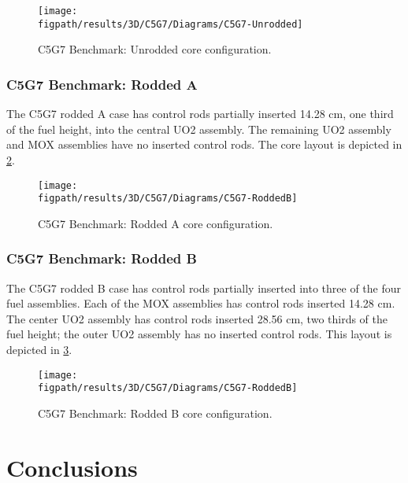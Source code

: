 {{{{        \begin{figure}[htbp]
          \centering
          \texttt{[image: \\figpath/results/3D/C5G7/Diagrams/C5G7-Unrodded]}
          \caption{C5G7 Benchmark: Unrodded core configuration. \label{fig:MR:C5G7:Unrodded}}
        \end{figure}
      }

      \subsubsection{C5G7 Benchmark: Rodded A}{\label{sssec:MR:C5G7:Rodded A}
        The C5G7 rodded A case has control rods partially inserted 14.28 cm, one third of the fuel height, into the central \ac{UO2} assembly.
        The remaining \ac{UO2} assembly and \ac{MOX} assemblies have no inserted control rods.
        The core layout is depicted in \cref{fig:MR:C5G7:Rodded A}.
        \begin{figure}[htbp]
          \centering
          \texttt{[image: \\figpath/results/3D/C5G7/Diagrams/C5G7-RoddedB]}
          \caption{C5G7 Benchmark: Rodded A core configuration. \label{fig:MR:C5G7:Rodded A}}
        \end{figure}
      }

      \subsubsection{C5G7 Benchmark: Rodded B}{\label{sssec:MR:C5G7:Rodded B}
        The C5G7 rodded B case has control rods partially inserted into three of the four fuel assemblies.
        Each of the \ac{MOX} assemblies has control rods inserted 14.28 cm.
        The center \ac{UO2} assembly has control rods inserted 28.56 cm, two thirds of the fuel height; the outer \ac{UO2} assembly has no inserted control rods.
        This layout is depicted in \cref{fig:MR:C5G7:Rodded B}.

        \begin{figure}[htbp]
          \centering
          \texttt{[image: \\figpath/results/3D/C5G7/Diagrams/C5G7-RoddedB]}
          \caption{C5G7 Benchmark: Rodded B core configuration. \label{fig:MR:C5G7:Rodded B}}
        \end{figure}
      }
    }
  }

  \section{Conclusions}{\label{sec:MR:Conclusions}

  }
  \printbibliography
}